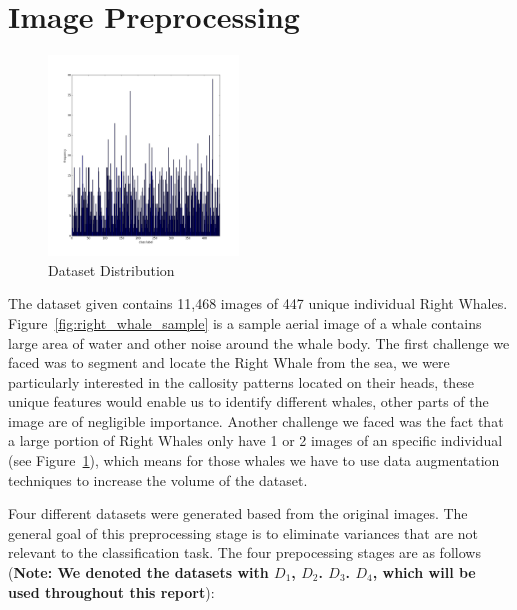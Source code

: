 \section{Image Preprocessing}
\label{sec:image_processing}

\begin{figure}
	\vspace{-1.2cm}
	\centering
	
	\includegraphics[width=0.45\textwidth]{sections/imgs/dataset/distribution.png}
	\caption{Dataset Distribution}
	\label{fig:dataset_distribution}
	
	\vspace{-1.0cm}
\end{figure}

The dataset given contains 11,468 images of 447 unique individual Right Whales. Figure~\ref{fig:right_whale_sample} is a sample aerial image of a whale contains large area of water and other noise around the whale body. The first challenge we faced was to segment and locate the Right Whale from the sea, we were particularly interested in the callosity patterns located on their heads, these unique features would enable us to identify different whales, other parts of the image are of negligible importance. Another challenge we faced was the fact that a large portion of Right Whales only have 1 or 2 images of an specific individual (see Figure~\ref{fig:dataset_distribution}), which means for those whales we have to use data augmentation techniques to increase the volume of the dataset.

Four different datasets were generated based from the original images. The general goal of this preprocessing stage is to eliminate variances that are not relevant to the classification task. The four prepocessing stages are as follows (\textbf{Note: We denoted the datasets with $D_{1}$, $D_{2}$. $D_{3}$. $D_{4}$, which will be used throughout this report}):

